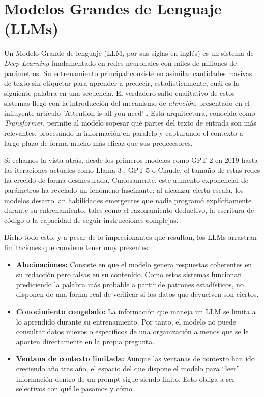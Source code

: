 \documentclass[12pt,a4paper,oneside]{report}
\begin{document}
\section{Modelos Grandes de Lenguaje (LLMs)}

Un Modelo Grande de lenguaje (LLM, por sus siglas en inglés) \cite{aws_llm} es un sistema de \textit{Deep Learning} fundamentado en redes neuronales con miles de millones de parámetros. Su entrenamiento principal consiste en asimilar cantidades masivas de texto sin etiquetar para aprender a predecir, estadísticamente, cuál es la siguiente palabra en una secuencia. El verdadero salto cualitativo de estos sistemas llegó con la introducción del mecanismo de \textit{atención}, presentado en el influyente artículo 'Attention is all you need' \cite{vaswani2017}. Esta arquitectura, conocida como \textit{Transformer}, permite al modelo sopesar qué partes del texto de entrada son más relevantes, procesando la información en paralelo y capturando el contexto a largo plazo de forma mucho más eficaz que sus predecesores.

Si echamos la vista atrás, desde los primeros modelos como GPT-2 en 2019 hasta las iteraciones actuales como Llama 3 \cite{meta_llama}, GPT-5 o Claude, el tamaño de estas redes ha crecido de forma desmesurada. Curiosamente, este aumento exponencial de parámetros ha revelado un fenómeno fascinante: al alcanzar cierta escala, los modelos desarrollan habilidades emergentes que nadie programó explícitamente durante su entrenamiento, tales como el razonamiento deductivo, la escritura de código o la capacidad de seguir instrucciones complejas.

Dicho todo esto, y a pesar de lo impresionantes que resultan, los LLMs arrastran limitaciones que conviene tener muy presentes:

\begin{itemize}
    \item \textbf{Alucinaciones:} Consiste en que el modelo genera respuestas coherentes en su redacción pero falsas en su contenido. Como estos sistemas funcionan prediciendo la palabra más probable a partir de patrones estadísticos, no disponen de una forma real de verificar si los datos que devuelven son ciertos.
    \item \textbf{Conocimiento congelado:} La información que maneja un LLM se limita a lo aprendido durante su entrenamiento. Por tanto, el modelo no puede consultar datos nuevos o específicos de una organización a menos que se le aporten directamente en la propia pregunta.
    \item \textbf{Ventana de contexto limitada:} Aunque las ventanas de contexto han ido creciendo año tras año, el espacio del que dispone el modelo para ``leer'' información dentro de un prompt sigue siendo finito. Esto obliga a ser selectivos con qué le pasamos y cómo.
\end{itemize}
\end{document}
